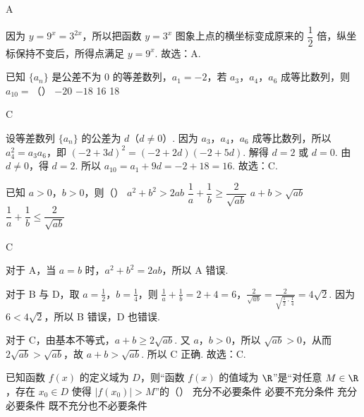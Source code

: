 \begin{answer}
A
\end{answer}

\begin{solution}
因为 \(y=9^x=3^{2x}\)，所以把函数 \(y=3^x\) 图象上点的横坐标变成原来的 \(\dfrac12\) 倍，纵坐标保持不变后，所得点满足 \(y=9^x\). 故选：A.
\end{solution}

\begin{problem}
已知 \(\{a_n\}\) 是公差不为 0 的等差数列，\(a_1=-2\)，若 \(a_3\)，\(a_4\)，\(a_6\) 成等比数列，则 \(a_{10}=\)（\quad）
\choices
    {\(-20\)}
    {\(-18\)}
    {16}
    {18}
\end{problem}

\begin{answer}
C
\end{answer}

\begin{solution}
设等差数列 \(\{a_n\}\) 的公差为 \(d\)（\(d\neq 0\)）. 因为 \(a_3\)，\(a_4\)，\(a_6\) 成等比数列，所以 \(a_4^2=a_3a_6\)，即 \((-2+3d)^2=(-2+2d)(-2+5d)\). 解得 \(d=2\) 或 \(d=0\). 由 \(d\neq 0\)，得 \(d=2\). 所以 \(a_{10}=a_1+9d=-2+18=16\). 故选：C.
\end{solution}

\begin{problem}
已知 \(a>0\)，\(b>0\)，则（\quad）
\choices
    {\(a^2+b^2>2ab\)}
    {\(\dfrac{1}{a}+\dfrac{1}{b}\ge \dfrac{2}{\sqrt{ab}}\)}
    {\(a+b>\sqrt{ab}\)}
    {\(\dfrac{1}{a}+\dfrac{1}{b}\le \dfrac{2}{\sqrt{ab}}\)}
\end{problem}

\begin{answer}
C
\end{answer}

\begin{solution}
对于 A，当 \(a=b\) 时，\(a^2+b^2=2ab\)，所以 A 错误.

对于 B 与 D，取 \(a=\frac12\)，\(b=\frac14\)，则 \(\frac{1}{a}+\frac{1}{b}=2+4=6\)，\(\frac{2}{\sqrt{ab}}=\frac{2}{\sqrt{\frac12\cdot\frac14}}=4\sqrt2\). 因为 \(6<4\sqrt2\)，所以 B 错误，D 也错误.

对于 C，由基本不等式，\(a+b\ge 2\sqrt{ab}\). 又 \(a\)，\(b>0\)，所以 \(\sqrt{ab}>0\)，从而 \(2\sqrt{ab}>\sqrt{ab}\)，故 \(a+b>\sqrt{ab}\).
所以 C 正确. 故选：C.
\end{solution}

\begin{problem}
已知函数 \(f(x)\) 的定义域为 \(D\)，则“函数 \(f(x)\) 的值域为 \(\R\)”是“对任意 \(M\in\R\)，存在 \(x_0\in D\) 使得 \(|f(x_0)|>M\)”的（\quad）
\choices
    {充分不必要条件}
    {必要不充分条件}
    {充分必要条件}
    {既不充分也不必要条件}
\end{problem}

